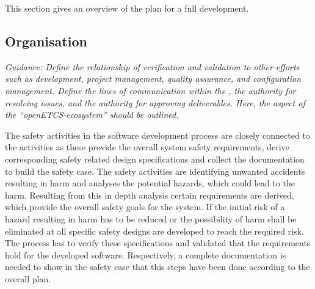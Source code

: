 \documentclass{template/openetcs_report}
\begin{document}
This section gives an overview of the \vv plan for a full development. 

\subsection{\VV Organisation}
\label{sec:vv-organisation}

\textit{Guidance: Define the relationship of verification and validation to other efforts such as development, project management, quality assurance, and configuration management. Define the lines of communication within the \vv, the authority for resolving issues, and the authority for approving \vv deliverables. Here, the \vv aspect of the ``openETCS-ecosystem'' should be outlined.}

The safety activities in the software development process are closely connected to the \vv activities as these provide the overall system safety requirements, derive corresponding safety related design specifications and collect the \vv documentation to build the safety case. The safety activities are identifying unwanted accidents resulting in harm and analyses the potential hazards, which could lead to the harm. Resulting from this in depth  analysis certain requirements are derived, which provide the overall safety goals for the system. If the initial risk of a hazard resulting in harm has to be reduced or the possibility of harm shall be eliminated at all specific safety designs are developed to reach the required risk. The \vv process has to verify these specifications and validated that the requirements hold for the developed software. Respectively, a complete documentation is needed to show in the safety case that this steps have been done according to the overall \vv plan.
\end{document}
